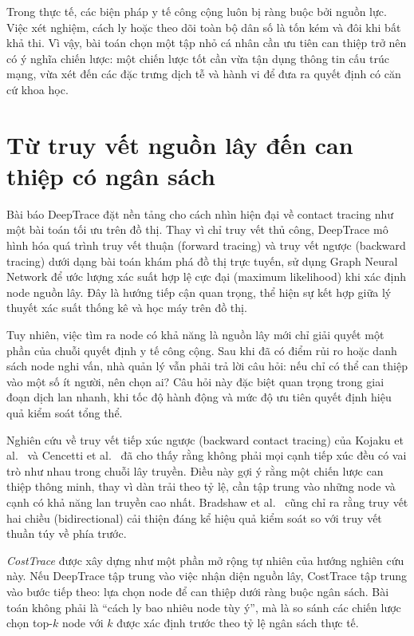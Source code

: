 \documentclass[12pt,a4paper]{report}
\theoremstyle{definition}
\begin{document}
Trong thực tế, các biện pháp y tế công cộng luôn bị ràng buộc bởi nguồn lực. Việc xét nghiệm, cách ly hoặc theo dõi toàn bộ dân số là tốn kém và đôi khi bất khả thi. Vì vậy, bài toán chọn một tập nhỏ cá nhân cần ưu tiên can thiệp trở nên có ý nghĩa chiến lược: một chiến lược tốt cần vừa tận dụng thông tin cấu trúc mạng, vừa xét đến các đặc trưng dịch tễ và hành vi để đưa ra quyết định có căn cứ khoa học.

\section{Từ truy vết nguồn lây đến can thiệp có ngân sách}

Bài báo DeepTrace \cite{deepTrace2025} đặt nền tảng cho cách nhìn hiện đại về contact tracing như một bài toán tối ưu trên đồ thị. Thay vì chỉ truy vết thủ công, DeepTrace mô hình hóa quá trình truy vết thuận (forward tracing) và truy vết ngược (backward tracing) dưới dạng bài toán khám phá đồ thị trực tuyến, sử dụng Graph Neural Network để ước lượng xác suất hợp lệ cực đại (maximum likelihood) khi xác định node nguồn lây. Đây là hướng tiếp cận quan trọng, thể hiện sự kết hợp giữa lý thuyết xác suất thống kê và học máy trên đồ thị.

Tuy nhiên, việc tìm ra node có khả năng là nguồn lây mới chỉ giải quyết một phần của chuỗi quyết định y tế công cộng. Sau khi đã có điểm rủi ro hoặc danh sách node nghi vấn, nhà quản lý vẫn phải trả lời câu hỏi: nếu chỉ có thể can thiệp vào một số ít người, nên chọn ai? Câu hỏi này đặc biệt quan trọng trong giai đoạn dịch lan nhanh, khi tốc độ hành động và mức độ ưu tiên quyết định hiệu quả kiểm soát tổng thể.

Nghiên cứu về truy vết tiếp xúc ngược (backward contact tracing) của Kojaku et al.\ \cite{kojaku2021} và Cencetti et al.\ \cite{cencetti2021} đã cho thấy rằng không phải mọi cạnh tiếp xúc đều có vai trò như nhau trong chuỗi lây truyền. Điều này gợi ý rằng một chiến lược can thiệp thông minh, thay vì dàn trải theo tỷ lệ, cần tập trung vào những node và cạnh có khả năng lan truyền cao nhất. Bradshaw et al.\ \cite{bradshaw2021} cũng chỉ ra rằng truy vết hai chiều (bidirectional) cải thiện đáng kể hiệu quả kiểm soát so với truy vết thuần túy về phía trước.

\textit{CostTrace} được xây dựng như một phần mở rộng tự nhiên của hướng nghiên cứu này. Nếu DeepTrace tập trung vào việc nhận diện nguồn lây, CostTrace tập trung vào bước tiếp theo: lựa chọn node để can thiệp dưới ràng buộc ngân sách. Bài toán không phải là ``cách ly bao nhiêu node tùy ý'', mà là so sánh các chiến lược chọn top-$k$ node với $k$ được xác định trước theo tỷ lệ ngân sách thực tế.
\end{document}
